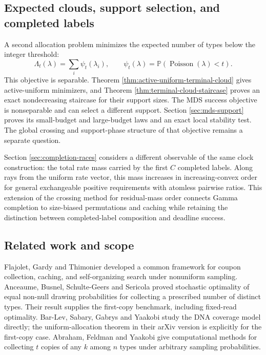 \documentclass[11pt]{article}
\theoremstyle{definition}
\theoremstyle{remark}
\DeclareMathOperator{\Poisson}{Poisson}
\newcommand{\Pbb}{\mathbb P}
\newcommand{\1}{\mathbf 1}
\begin{document}
\subsection{Expected clouds, support selection, and completed labels}
A second allocation problem minimizes the expected number of types below the integer threshold:
\[
 \Lambda_t(\lambda)=\sum_i\psi_t(\lambda_i),
 \qquad \psi_t(\lambda)=\Pbb(\Poisson(\lambda)<t).
\]
This objective is separable. Theorem \ref{thm:active-uniform-terminal-cloud} gives active-uniform minimizers, and Theorem \ref{thm:terminal-cloud-staircase} proves an exact nondecreasing staircase for their support sizes. The MDS success objective is nonseparable and can select a different support. Section \ref{sec:mds-support} proves its small-budget and large-budget laws and an exact local stability test. The global crossing and support-phase structure of that objective remains a separate question.

Section \ref{sec:completion-races} considers a different observable of the same clock construction: the total rate mass carried by the first \(C\) completed labels. Along rays from the uniform rate vector, this mass increases in increasing-convex order for general exchangeable positive requirements with atomless pairwise ratios. This extension of the crossing method for residual-mass order connects Gamma completion to size-biased permutations and caching while retaining the distinction between completed-label composition and deadline success.

\subsection{Related work and scope}
Flajolet, Gardy and Thimonier \cite{FGT1992} developed a common framework for coupon collection, caching, and self-organizing search under nonuniform sampling. Anceaume, Busnel, Schulte-Geers and Sericola \cite{Anceaume2015} proved stochastic optimality of equal non-null drawing probabilities for collecting a prescribed number of distinct types. Their result supplies the first-copy benchmark, including fixed-read optimality. Bar-Lev, Sabary, Gabrys and Yaakobi \cite{BarLevSabaryGabrysYaakobi2025} study the DNA coverage model directly; the uniform-allocation theorem in their arXiv version is explicitly for the first-copy case. Abraham, Feldman and Yaakobi \cite{Abraham2026} give computational methods for collecting \(t\) copies of any \(k\) among \(n\) types under arbitrary sampling probabilities.
\end{document}
